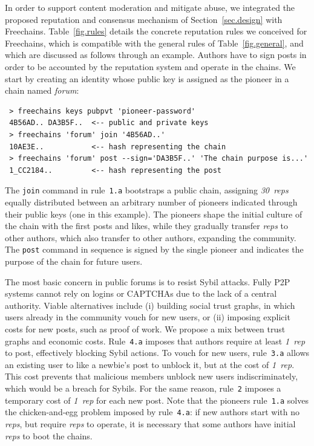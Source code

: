 \documentclass[12pt]{article}
\newcommand{\FC}       {Freechains\xspace}
\newcommand{\reps}     {\emph{reps}\xspace}
\newcommand{\onerep}   {\emph{1~rep}\xspace}
\newcommand{\nreps}[1] {\emph{#1~reps\xspace}}
\newcommand{\code}[1]  {\texttt{\footnotesize{#1}}}
\begin{document}
In order to support content moderation and mitigate abuse, we integrated the
proposed reputation and consensus mechanism of Section~\ref{sec.design} with
\FC.
Table~\ref{fig.rules} details the concrete reputation rules we conceived for
\FC, which is compatible with the general rules of Table~\ref{fig.general}, and
which are discussed as follows through an example.
Authors have to sign posts in order to be accounted by the reputation system
and operate in the chains.
We start by creating an identity whose public key is assigned as the pioneer in
a chain named \emph{forum}:

{\footnotesize
\begin{verbatim}
 > freechains keys pubpvt 'pioneer-password'
 4B56AD.. DA3B5F..  <-- public and private keys
 > freechains 'forum' join '4B56AD..'
 10AE3E..           <-- hash representing the chain
 > freechains 'forum' post --sign='DA3B5F..' 'The chain purpose is...'
 1_CC2184..         <-- hash representing the post
\end{verbatim}
}

The \code{join} command in rule~\code{1.a} bootstraps a public chain,
assigning \nreps{30} equally distributed between an arbitrary number of
pioneers indicated through their public keys (one in this example).
The pioneers shape the initial culture of the chain with the first posts and
likes, while they gradually transfer \reps to other authors, which also
transfer to other authors, expanding the community.
%
The \code{post} command in sequence is signed by the single pioneer and
indicates the purpose of the chain for future users.

The most basic concern in public forums is to resist Sybil attacks.
Fully P2P systems cannot rely on logins or {\footnotesize CAPTCHAs} due to the
lack of a central authority.
Viable alternatives include (i) building social trust graphs, in which users
already in the community vouch for new users, or (ii) imposing explicit costs
for new posts, such as proof of work.
%
We propose a mix between trust graphs and economic costs.
%
Rule~\code{4.a} imposes that authors require at least \onerep to post,
effectively blocking Sybil actions.
To vouch for new users, rule~\code{3.a} allows an existing user to like a
newbie's post to unblock it, but at the cost of \onerep.
This cost prevents that malicious members unblock new users indiscriminately,
which would be a breach for Sybils.
For the same reason, rule~\code{2} imposes a temporary cost of \onerep for
each new post.
%
Note that the pioneers rule~\code{1.a} solves the chicken-and-egg problem
imposed by rule~\code{4.a}: if new authors start with no \reps, but require
\reps to operate, it is necessary that some authors have initial \reps to boot
the chains.
\end{document}
